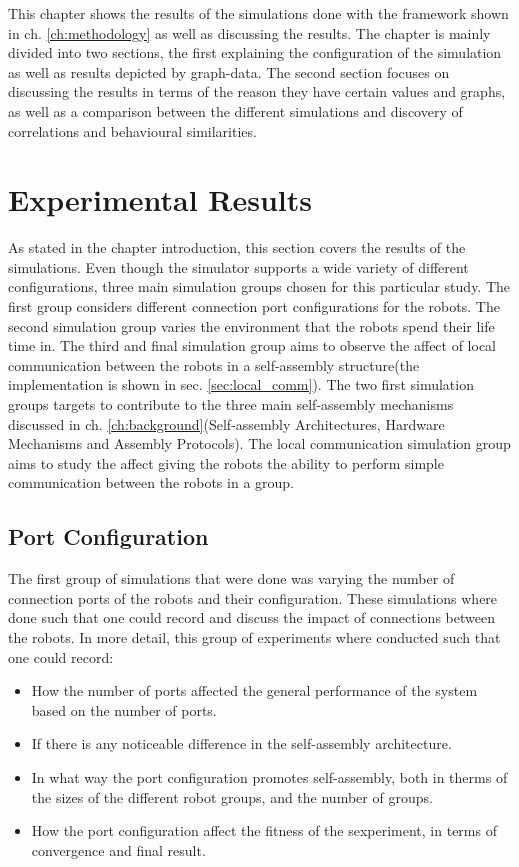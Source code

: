 This chapter shows the results of the simulations done with the framework shown in ch. \ref{ch:methodology} as well as discussing the results.
The chapter is mainly divided into two sections, the first explaining the configuration of the simulation as well as results depicted by graph-data.
The second section focuses on discussing the results in terms of the reason they have certain values and graphs, as well as a comparison between the different simulations and discovery of correlations and behavioural similarities.

\section{Experimental Results}
As stated in the chapter introduction, this section covers the results of the simulations. 
Even though the simulator supports a wide variety of different configurations, three main simulation groups chosen for this particular study.
The first group considers different connection port configurations for the robots.
The second simulation group varies the environment that the robots spend their life time in.
The third and final simulation group aims to observe the affect of local communication between the robots in a self-assembly structure(the implementation is shown in sec. \ref{sec:local_comm}).
The two first simulation groups targets to contribute to the three main self-assembly mechanisms discussed in ch. \ref{ch:background}(Self-assembly Architectures, Hardware Mechanisms and Assembly Protocols).
The local communication simulation group aims to study the affect giving the robots the ability to perform simple communication between the robots in a group.

\subsection{Port Configuration}
The first group of simulations that were done was varying the number of connection ports of the robots and their configuration.
These simulations where done such that one could record and discuss the impact of connections between the robots.
In more detail, this group of experiments where conducted such that one could record:

\begin{itemize}
	\item How the number of ports affected the general performance of the system based on the number of ports.
	\item If there is any noticeable difference in the self-assembly architecture.
	\item In what way the port configuration promotes self-assembly, both in therms of the sizes of the different robot groups, and the number of groups.
	\item How the port configuration affect the fitness of the sexperiment, in terms of convergence and final result.
\end{itemize}

